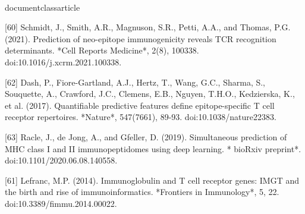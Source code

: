 \\documentclass{article}
\begin{document}
[60] Schmidt, J., Smith, A.R., Magnuson, S.R., Petti, A.A., and Thomas, P.G. (2021). Prediction of neo-epitope immunogenicity reveals TCR recognition determinants. *Cell Reports Medicine*, 2(8), 100338. doi:10.1016/j.xcrm.2021.100338.

[62] Dash, P., Fiore-Gartland, A.J., Hertz, T., Wang, G.C., Sharma, S., Souquette, A., Crawford, J.C., Clemens, E.B., Nguyen, T.H.O., Kedzierska, K., et al. (2017). Quantifiable predictive features define epitope-specific T cell receptor repertoires. *Nature*, 547(7661), 89-93. doi:10.1038/nature22383.

[63] Racle, J., de Jong, A., and Gfeller, D. (2019). Simultaneous prediction of MHC class I and II immunopeptidomes using deep learning. * bioRxiv preprint*. doi:10.1101/2020.06.08.140558.

[61] Lefranc, M.P. (2014). Immunoglobulin and T cell receptor genes: IMGT and the birth and rise of immunoinformatics. *Frontiers in Immunology*, 5, 22. doi:10.3389/fimmu.2014.00022.

\
\end{document}

